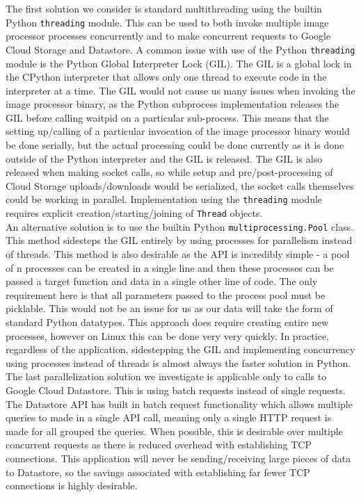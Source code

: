 \documentclass[10pt, onecolumn, draftclsnofoot, letterpaper, compsoc]{IEEEtran}
\begin{document}
The first solution we consider is standard multithreading using the builtin
Python {\tt threading} module. This can be used to both invoke multiple image
processor processes concurrently and to make concurrent requests to Google
Cloud Storage and Datastore. A common issue with use of the Python {\tt threading}
module is the Python Global Interpreter Lock (GIL)\cite{gilArticle}. The GIL
is a global lock in the CPython interpreter that allows only one thread to
execute code in the interpreter at a time\cite{gilArticle}. The GIL would
not cause us many issues when invoking the image processor binary, as
the Python subprocess implementation releases the GIL before calling
waitpid on a particular sub-process. This means that the
setting up/calling of a particular invocation of the image processor binary
would be done serially, but the actual processing could be done currently as
it is done outside of the Python interpreter and the GIL is released\cite{gilArticle}.
The GIL is also released when making socket calls, so while setup and
pre/post-processing of Cloud Storage uploads/downloads would be
serialized, the socket calls themselves could be working in parallel\cite{gilArticle}.
Implementation using the {\tt threading} module requires explicit
creation/starting/joining of {\tt Thread} objects. \\

An alternative solution is to use the builtin Python {\tt multiprocessing.Pool}
class. This method sidesteps the GIL entirely by using processes for
parallelism instead of threads\cite{multiproc}. This method is also desirable
as the API is incredibly simple - a pool of n processes can be created in a
single line and then these processes can be passed a target function and
data in a single other line of code\cite{multiproc}. The only requirement
here is that all parameters passed to the process pool must be picklable\cite{multiproc}.
This would not be an issue for us as our data will take the form of standard
Python datatypes. This approach does require creating entire new processes,
however on Linux this can be done very very quickly. In practice, regardless
of the application, sidestepping the GIL and implementing concurrency using
processes instead of threads is almost always the faster solution in Python. \\

The last parallelization solution we investigate is applicable only to calls to
Google Cloud Datastore. This is using batch requests instead of single requests.
The Datastore API has built in batch request functionality which allows multiple
queries to made in a single API call, meaning only a single HTTP request is made
for all grouped the queries\cite{batches}. When possible, this is desirable over
multiple concurrent requests as there is reduced overhead with establishing
TCP connections. This application will never be sending/receiving large
pieces of data to Datastore, so the savings associated with establishing
far fewer TCP connections is highly desirable. \\
\end{document}
